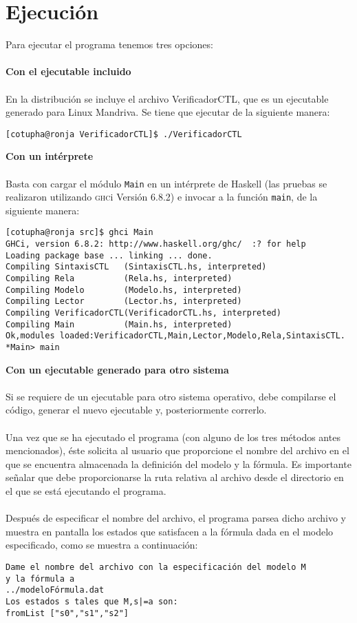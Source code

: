\documentclass[12pt,letterpaper,spanish]{article}
\begin{document}
\section{Ejecución}
Para ejecutar el programa tenemos tres opciones:
\\\\
\textbf{Con el ejecutable incluido}
\\\\
En la distribución se incluye el archivo VerificadorCTL, que es un ejecutable generado 
para Linux Mandriva.
Se tiene que ejecutar de la siguiente manera:
\begin{verbatim}
[cotupha@ronja VerificadorCTL]$ ./VerificadorCTL
\end{verbatim}
\textbf{Con un intérprete}
\\\\
Basta con cargar el módulo \texttt{Main} en un intérprete de Haskell (las
pruebas se realizaron utilizando \textsc{ghc}i Versión 6.8.2) e invocar a la función
\texttt{main}, de la siguiente manera:
\begin{verbatim}
[cotupha@ronja src]$ ghci Main
GHCi, version 6.8.2: http://www.haskell.org/ghc/  :? for help
Loading package base ... linking ... done.
Compiling SintaxisCTL   (SintaxisCTL.hs, interpreted)
Compiling Rela          (Rela.hs, interpreted)
Compiling Modelo        (Modelo.hs, interpreted)
Compiling Lector        (Lector.hs, interpreted)
Compiling VerificadorCTL(VerificadorCTL.hs, interpreted)
Compiling Main          (Main.hs, interpreted)
Ok,modules loaded:VerificadorCTL,Main,Lector,Modelo,Rela,SintaxisCTL.
*Main> main
\end{verbatim}
\textbf{Con un ejecutable generado para otro sistema}
\\\\
Si se requiere de un ejecutable para otro sistema operativo, debe compilarse el código,
generar el nuevo ejecutable y, posteriormente correrlo.
\\\\
Una vez que se ha ejecutado el programa (con alguno de los tres métodos antes mencionados),
éste solicita al usuario que proporcione el nombre del archivo en el
que se encuentra almacenada la definición del modelo y la fórmula. Es importante señalar que debe
proporcionarse la ruta relativa al archivo desde el directorio en el que se está ejecutando
el programa.
\\\\
Después de especificar el nombre del archivo, el programa parsea dicho archivo y muestra en pantalla
los estados que satisfacen a la fórmula dada en el modelo especificado, como se muestra a continuación:
\begin{verbatim}
Dame el nombre del archivo con la especificación del modelo M 
y la fórmula a
../modeloFórmula.dat
Los estados s tales que M,s|=a son:
fromList ["s0","s1","s2"]
\end{verbatim}
\end{document}

